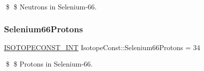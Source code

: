 \$ \$ Neutrons in Selenium-\/66. \mbox{\label{group___isotope_const-_selenium-_se66_gaaad89e12afaf7886d24448b39bb290cf}} 
\subsubsection{\texorpdfstring{Selenium66\+Protons}{Selenium66Protons}}
{\footnotesize\ttfamily \mbox{\hyperlink{group___isotope_const-_macros_ga5f18360b3e99483a35c32d789e62621c}{I\+S\+O\+T\+O\+P\+E\+C\+O\+N\+S\+T\+\_\+\+I\+NT}} Isotope\+Const\+::\+Selenium66\+Protons = 34}

\$ \$ Protons in Selenium-\/66. 